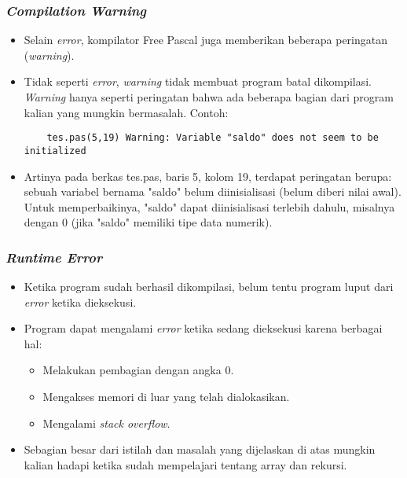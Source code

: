 \begin{frame}[fragile]
\frametitle{\textit{Compilation Warning}}
\begin{itemize}
  \item Selain \textit{error}, kompilator Free Pascal juga memberikan beberapa peringatan (\textit{warning}).
  \item Tidak seperti \textit{error}, \textit{warning} tidak membuat program batal dikompilasi. \textit{Warning} hanya seperti peringatan bahwa ada beberapa bagian dari program kalian yang mungkin bermasalah. Contoh:
  \begin{lstlisting}
    tes.pas(5,19) Warning: Variable "saldo" does not seem to be initialized
  \end{lstlisting}
  \item Artinya pada berkas tes.pas, baris 5, kolom 19, terdapat peringatan berupa: sebuah variabel bernama "saldo" belum diinisialisasi (belum diberi nilai awal). Untuk memperbaikinya, "saldo" dapat diinisialisasi terlebih dahulu, misalnya dengan 0 (jika "saldo" memiliki tipe data numerik).
\end{itemize}
\end{frame}

\begin{frame}
\frametitle{\textit{Runtime Error}}
\begin{itemize}
  \item Ketika program sudah berhasil dikompilasi, belum tentu program luput dari \textit{error} ketika dieksekusi.
  \item Program dapat mengalami \textit{error} ketika sedang dieksekusi karena berbagai hal:
  \begin{itemize}
    \item Melakukan pembagian dengan angka 0.
    \item Mengakses memori di luar yang telah dialokasikan.
    \item Mengalami \textit{stack overflow}.
  \end{itemize}
  \item Sebagian besar dari istilah dan masalah yang dijelaskan di atas mungkin kalian hadapi ketika sudah mempelajari tentang array dan rekursi.
\end{itemize}
\end{frame}

